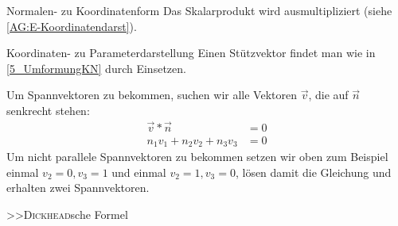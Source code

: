 \begin{bla}{Normalen- zu Koordinatenform}
  Das Skalarprodukt wird ausmultipliziert (siehe \ref{AG:E-Koordinatendarst}).
\end{bla}



\begin{bla}{Koordinaten- zu Parameterdarstellung}
  Einen Stützvektor findet man wie in \ref{5_UmformungKN} durch Einsetzen.

  Um Spannvektoren zu bekommen, suchen wir alle Vektoren $\vec{v}$, die auf $\vec{n}$ senkrecht stehen:
  \begin{align*}
    \vec{v} * \vec{n} &= 0\\
    n_1v_1 + n_2v_2 + n_3v_3 &= 0
  \end{align*}
  Um nicht parallele Spannvektoren zu bekommen setzen wir oben zum Beispiel einmal $v_2 = 0, v_3 = 1$ und einmal $v_2 = 1, v_3 = 0$, lösen damit die Gleichung und erhalten zwei Spannvektoren.

  >>\textsc{Dickhead}sche Formel
\end{bla}
